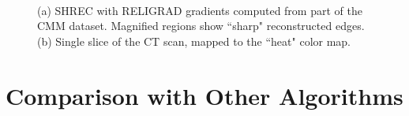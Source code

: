 \begin{figure}[htb]
	\centering
	\\
	\caption{(a) SHREC with RELIGRAD gradients computed from part of the CMM dataset. Magnified regions show ``sharp" reconstructed edges. (b) Single slice of the CT scan, mapped to the ``heat" color map.}\label{fig:ict:CMM}
\end{figure}
\section{Comparison with Other Algorithms}
\label{section:comparison}
